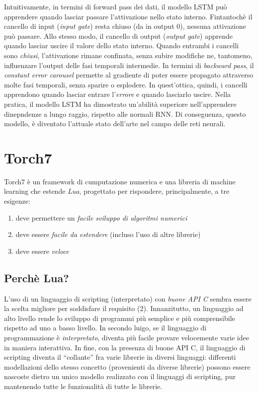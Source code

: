 Intuitivamente, in termini di forward pass dei dati, il modello LSTM pu\`o apprendere quando lasciar passare l'attivazione nello stato interno.
Fintantoch\`e il cancello di input (\emph{input gate}) resta chiuso (da in output 0), nessuna attivazione pu\`o passare.
Allo stesso modo, il cancello di output (\emph{output gate}) apprende quando lasciar uscire il valore dello stato interno.
Quando entrambi i cancelli sono \emph{chiusi}, l'attivazione rimane confinata, senza subire modifiche ne, tantomeno, influenzare l'output delle fasi temporali intermedie.
In termini di \emph{backward pass}, il \emph{constant error carousel} permette al gradiente di poter essere propagato attraverso molte fasi temporali, senza sparire o esplodere.
In quest'ottica, quindi, i cancelli apprendono quando lasciar entrare l'\emph{errore} e quando lasciarlo uscire.
Nella pratica, il modello LSTM ha dimostrato un'abilit\`a superiore nell'apprendere dinepndenze a lungo raggio, rispetto alle normali RNN.
Di conseguenza, questo modello, \`e diventato l'attuale stato dell'arte nel campo delle reti neurali.

\section{Torch7}
\label{sec:torch}
\nocite{Collobert:2011}

Torch7 \`e un framework di cumputazione numerica e una libreria di machine learning che estende \emph{Lua}, progettato per rispondere, principalmente, a tre esigenze:
\begin{enumerate}
  \item deve permettere un \emph{facile sviluppo di algoritmi numerici}
  \item deve essere \emph{facile da estendere} (incluso l'uso di altre librerie)
  \item deve essere \emph{veloce}
\end{enumerate}

\subsection{Perch\`e Lua?}
L'uso di un linguaggio di scripting (interpretato) con \emph{buone API C} sembra essere la scelta migliore per soddisfare il requisito (2).
Innanzitutto, un linguaggio ad alto livello rende lo sviluppo di programmi pi\`u semplice e pi\`u comprensibile rispetto ad uno a basso livello.
In secondo luigo, se il linguaggio di programmazione \`e \emph{interpretato}, diventa pi\`u facile provare velocemente varie idee in maniera interattiva.
In fine, con la presenza di buone API C, il linguaggio di scripting diventa il ``collante'' fra varie librerie in diversi linguaggi: differenti modellazioni dello stesso concetto (provenienti da diverse librerie) possono essere nascoste dietro un unico modello realizzato con il linguaggi di scripting, pur mantenendo tutte le funzionalit\`a di tutte le librerie.

